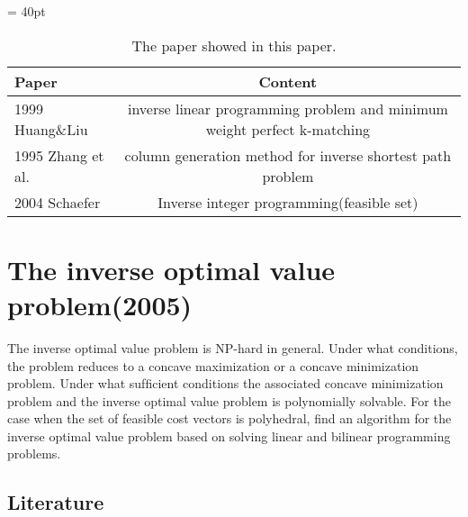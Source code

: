 \documentclass[UTF8]{article}
\begin{document}
\begin{table}[ht]

 \tabcolsep = 40pt

 \small\renewcommand{}

 \caption{The paper showed in this paper.\label{tab:5}}

 {\begin{tabular}{lc}
   \hline
   Paper             & Content                                                                  \\
   \hline
   1999 Huang\&Liu   & inverse linear programming problem and minimum weight perfect k-matching \\
   \hline
   1995 Zhang et al. & column generation method for inverse shortest path problem               \\
   \hline
   2004 Schaefer     & Inverse integer programming(feasible set)                                \\
   \hline
  \end{tabular}}
 {}
\end{table}


\section{The inverse optimal value problem(2005)}

The inverse optimal value problem is NP-hard in general. Under what conditions, the problem reduces to a concave maximization or a concave minimization problem. Under what sufﬁcient conditions the associated concave minimization problem and the inverse optimal value problem is polynomially solvable. For the case when the set of feasible cost vectors is polyhedral, find an algorithm for the inverse optimal value problem based on solving linear and bilinear programming problems.


\subsection{Literature}
\end{document}
